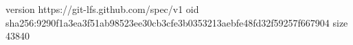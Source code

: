 version https://git-lfs.github.com/spec/v1
oid sha256:9290f1a3ea3f51ab98523ee30cb3cfe3b0353213aebfe48fd32f59257f667904
size 43840
